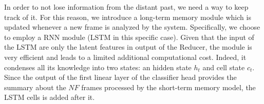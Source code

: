 In order to not lose information from the distant past, we need a way to keep track of it.
For this reason, we introduce a long-term memory module  which is updated whenever a new frame is analyzed by the system.
Specifically, we choose to employ a RNN module (LSTM \cite{lstm,gru} in this specific case).
Given that the input of the LSTM  are only the latent features in output of the Reducer, the module is very efficient and leads to a limited additional computational cost.
Indeed, it condenses all its knowledge into two states: an hidden state $h_t$ and cell state $c_t$.
Since the output of the first linear layer of the classifier head provides the summary about the $NF$ frames processed by the short-term memory model, the LSTM cells is added after it.

